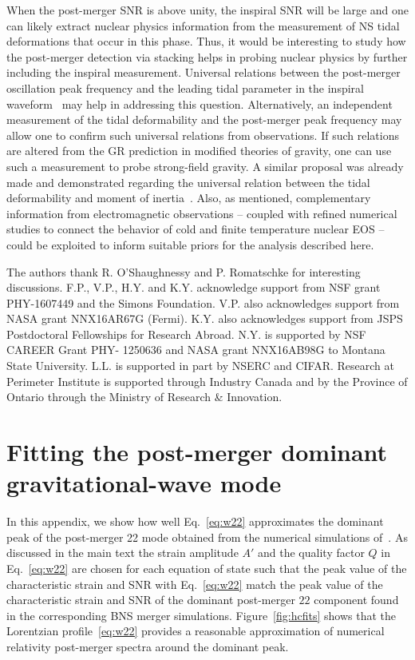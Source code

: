 \documentclass[prd,aps,floatfix,superscriptaddress,nofootinbib,twocolumn,10pt,English]{revtex4-1}
\begin{document}
When the post-merger SNR is above unity, the inspiral SNR will be
large and one can likely extract nuclear physics information from the
measurement of NS tidal deformations that occur in this phase.  Thus,
it would be interesting to study how the post-merger detection via
stacking helps in probing nuclear physics by further including the
inspiral measurement. Universal relations between the post-merger
oscillation peak frequency and the leading tidal parameter in the
inspiral waveform~\cite{Takami:2014tva,Bernuzzi:2015rla} may help in
addressing this question.  Alternatively, an independent measurement
of the tidal deformability and the post-merger peak frequency may
allow one to confirm such universal relations from observations. If
such relations are altered from the GR prediction in modified
theories of gravity, one can use such a measurement to probe
strong-field gravity.  A similar proposal was already made and
demonstrated regarding the universal relation between the tidal
deformability and moment of
inertia~\cite{Yagi:2013bca,Yagi:2013awa,Yagi:2016bkt}. Also, 
as mentioned, complementary information from electromagnetic observations
-- coupled with refined numerical studies to connect the behavior of
cold and finite temperature nuclear EOS --
could be exploited to inform suitable priors for the analysis
described here.





\acknowledgements The authors thank R. O'Shaughnessy and P. Romatschke 
for interesting discussions. F.P., V.P., H.Y. and
K.Y. acknowledge support from NSF grant PHY-1607449 and the Simons
Foundation. V.P. also acknowledges support from NASA grant NNX16AR67G
(Fermi). K.Y. also acknowledges support from JSPS Postdoctoral
Fellowships for Research Abroad.  N.Y. is supported by NSF CAREER Grant PHY- 1250636 and NASA
grant NNX16AB98G to Montana State University. L.L. is supported in part
by NSERC and CIFAR. Research at Perimeter Institute is supported through 
Industry Canada and by the  Province of Ontario
through the Ministry of Research \& Innovation.

  
\appendix

\section{Fitting the post-merger dominant gravitational-wave mode}
\label{appendix:fits}

In this appendix, we show how well Eq.~\eqref{eq:w22} approximates the
dominant peak of the post-merger 22 mode obtained from the numerical
simulations
of~\cite{Sekiguchi:2011mc,Stergioulas:2011gd,Palenzuela:2015dqa}.  As
discussed in the main text the strain amplitude $A'$ and the quality
factor $Q$ in Eq.~\eqref{eq:w22} are chosen for each equation of state
such that the peak value of the characteristic strain and SNR with
Eq.~\eqref{eq:w22} match the peak value of the characteristic strain
and SNR of the dominant post-merger $22$ component found in the
corresponding BNS merger simulations. Figure~\ref{fig:hcfits} shows
that the Lorentzian profile~\eqref{eq:w22} provides a reasonable
approximation of numerical relativity post-merger spectra around the
dominant peak.
\end{document}
